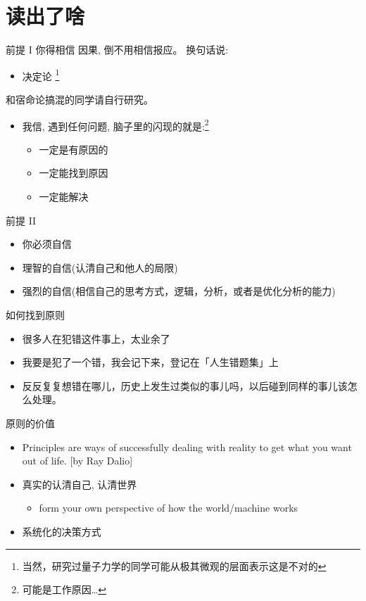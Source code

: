 \documentclass[presentation, bigger]{beamer}
\begin{document}
\section{读出了啥}
\label{sec:org95e4ad7}
\begin{frame}[label={sec:orgf4e6e5c}]{前提 I}
你得相信 \alert{因果}, 倒不用相信报应。 换句话说:

\begin{itemize}
\item \alert{决定论} \footnote{当然，研究过量子力学的同学可能从极其微观的层面表示这是不对的}
\end{itemize}

和宿命论搞混的同学请自行研究。

\begin{itemize}
\item <2-> 我信, 遇到任何问题, 脑子里的闪现的就是:\footnote{可能是工作原因\ldots{}}
\begin{itemize}
\item \alert{一定是有原因的}
\item \alert{一定能找到原因}
\item \alert{一定能解决}
\end{itemize}
\end{itemize}
\end{frame}

\begin{frame}[label={sec:org09ce741}]{前提 II}
\begin{itemize}
\item 你必须自信
\item 理智的自信(认清自己和他人的局限)
\item 强烈的自信(相信自己的思考方式，逻辑，分析，或者是优化分析的能力)
\end{itemize}
\end{frame}

\begin{frame}[label={sec:org49d443b}]{如何找到原则}
\begin{itemize}
\item 很多人在犯错这件事上，太业余了
\item 我要是犯了一个错，我会记下来，登记在「人生错题集」上
\item 反反复复想错在哪儿，历史上发生过类似的事儿吗，以后碰到同样的事儿该怎么处理。
\end{itemize}
\end{frame}

\begin{frame}[label={sec:org8c2d4d6}]{原则的价值}
\begin{itemize}
\item Principles are ways of successfully dealing with reality to get what you want out of life. [by Ray Dalio]
\item 真实的认清自己, 认清世界
\begin{itemize}
\item form your own perspective of how the world/machine works
\end{itemize}
\item 系统化的决策方式
\end{itemize}
\end{frame}
\end{document}
